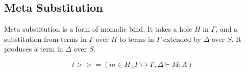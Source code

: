 \subsection{Meta Substitution}
Meta substitution is a form of monadic bind.
It takes a hole $H$ in $\Gamma$, and a substitution from terms in $\Gamma$ over $H$ to terms in $\Gamma$ extended by $\Delta$ over $S$. It produces a term in $\Delta$ over $S$.

\[
  t >>= (m \in H_A\Gamma \mapsto \Gamma, \Delta \vdash M : A)
\]
